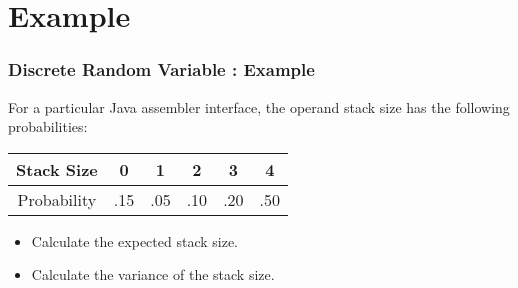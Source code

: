 \documentclass{beamer}
\begin{document}
\section*{Example}

\begin{frame}
\frametitle{Discrete Random Variable : Example}
For a particular Java assembler interface, the operand stack size has the
following probabilities:

\begin{tabular}{|c||c|c|c|c|c|}
  \hline
  Stack Size  & 0 & 1 & 2 & 3 & 4 \\ \hline
 Probability & .15 & .05 & .10 &.20 &.50\\
  \hline
\end{tabular}

\begin{itemize}

\item Calculate the expected stack size.
\item Calculate the variance of the stack size.

\end{itemize}
\end{frame}
\end{document}
